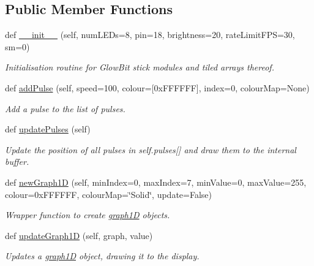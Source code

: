 \subsection*{Public Member Functions}
\begin{DoxyCompactItemize}
\item 
def \hyperlink{classglowbit_1_1stick_ac51b02c334481110558ac2f8c54938b8}{\+\_\+\+\_\+init\+\_\+\+\_\+} (self, num\+L\+E\+Ds=8, pin=18, brightness=20, rate\+Limit\+F\+PS=30, sm=0)
\begin{DoxyCompactList}\small\item\em Initialisation routine for Glow\+Bit stick modules and tiled arrays thereof. \end{DoxyCompactList}\item 
def \hyperlink{classglowbit_1_1stick_a14fb6c41aebc0b87595dde1ee4dd35a3}{add\+Pulse} (self, speed=100, colour=\mbox{[}0x\+F\+F\+F\+F\+F\+F\mbox{]}, index=0, colour\+Map=\+None)
\begin{DoxyCompactList}\small\item\em Add a pulse to the list of pulses. \end{DoxyCompactList}\item 
def \hyperlink{classglowbit_1_1stick_a84e72d81b9c96b1acb268b730866a8ea}{update\+Pulses} (self)
\begin{DoxyCompactList}\small\item\em Update the position of all pulses in self.\+pulses\mbox{[}\mbox{]} and draw them to the internal buffer. \end{DoxyCompactList}\item 
def \hyperlink{classglowbit_1_1stick_a7965a4a624257f0f05918b610a39224f}{new\+Graph1D} (self, min\+Index=0, max\+Index=7, min\+Value=0, max\+Value=255, colour=0x\+F\+F\+F\+F\+F\+F, colour\+Map=\char`\"{}\+Solid\char`\"{}, update=\+False)
\begin{DoxyCompactList}\small\item\em Wrapper function to create \hyperlink{classglowbit_1_1stick_1_1graph1D}{graph1D} objects. \end{DoxyCompactList}\item 
def \hyperlink{classglowbit_1_1stick_acde1622da63c602b209a608384cb6020}{update\+Graph1D} (self, graph, value)
\begin{DoxyCompactList}\small\item\em Updates a \hyperlink{classglowbit_1_1stick_1_1graph1D}{graph1D} object, drawing it to the display. \end{DoxyCompactList}\item 

\end{DoxyCompactItemize}
